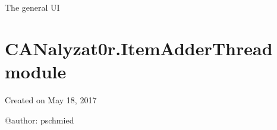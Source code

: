 \documentclass[letterpaper,10pt,english]{sphinxmanual}
\begin{document}

\begin{fulllineitems}
\label{\detokenize{src:src.Globals.ui}}
The general UI

\end{fulllineitems}



\section{CANalyzat0r.ItemAdderThread module}
\label{\detokenize{src:canalyzat0r-itemadderthread-module}}\label{\detokenize{src:module-src.ItemAdderThread}}
Created on May 18, 2017

@author: pschmied
\end{document}
